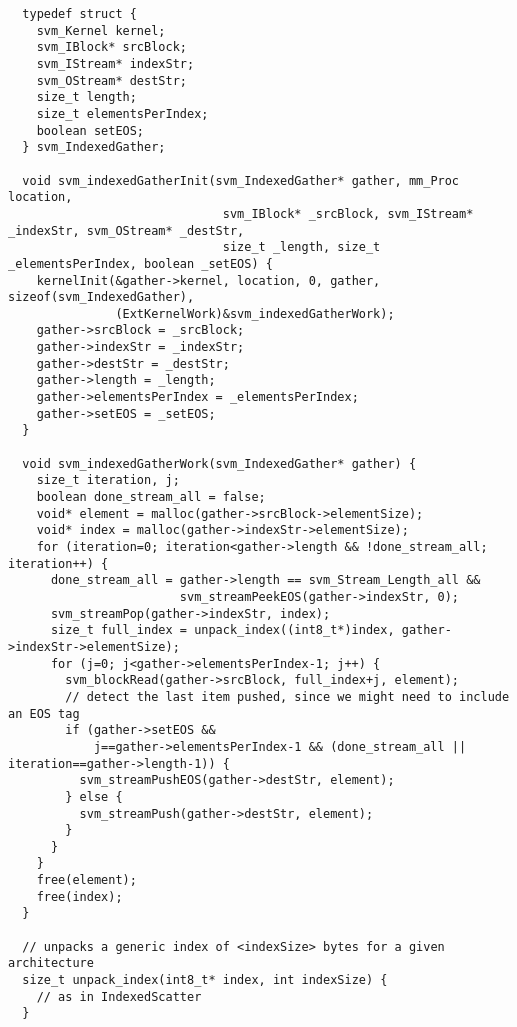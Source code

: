 \clearpage
\makeline
{}
{\small
\begin{verbatim}
  typedef struct {
    svm_Kernel kernel;
    svm_IBlock* srcBlock;
    svm_IStream* indexStr;
    svm_OStream* destStr;
    size_t length;
    size_t elementsPerIndex;
    boolean setEOS;
  } svm_IndexedGather;

  void svm_indexedGatherInit(svm_IndexedGather* gather, mm_Proc location, 
                              svm_IBlock* _srcBlock, svm_IStream* _indexStr, svm_OStream* _destStr,
                              size_t _length, size_t _elementsPerIndex, boolean _setEOS) {
    kernelInit(&gather->kernel, location, 0, gather, sizeof(svm_IndexedGather), 
               (ExtKernelWork)&svm_indexedGatherWork);
    gather->srcBlock = _srcBlock;
    gather->indexStr = _indexStr;
    gather->destStr = _destStr;
    gather->length = _length;
    gather->elementsPerIndex = _elementsPerIndex;
    gather->setEOS = _setEOS;
  }

  void svm_indexedGatherWork(svm_IndexedGather* gather) {
    size_t iteration, j;
    boolean done_stream_all = false;
    void* element = malloc(gather->srcBlock->elementSize);
    void* index = malloc(gather->indexStr->elementSize);
    for (iteration=0; iteration<gather->length && !done_stream_all; iteration++) {
      done_stream_all = gather->length == svm_Stream_Length_all && 
                        svm_streamPeekEOS(gather->indexStr, 0);
      svm_streamPop(gather->indexStr, index);
      size_t full_index = unpack_index((int8_t*)index, gather->indexStr->elementSize);
      for (j=0; j<gather->elementsPerIndex-1; j++) {
        svm_blockRead(gather->srcBlock, full_index+j, element);
        // detect the last item pushed, since we might need to include an EOS tag
        if (gather->setEOS && 
            j==gather->elementsPerIndex-1 && (done_stream_all || iteration==gather->length-1)) {
          svm_streamPushEOS(gather->destStr, element);
        } else {
          svm_streamPush(gather->destStr, element);
        }
      }
    }
    free(element);
    free(index);
  }

  // unpacks a generic index of <indexSize> bytes for a given architecture
  size_t unpack_index(int8_t* index, int indexSize) {
    // as in IndexedScatter
  }
\end{verbatim}}
